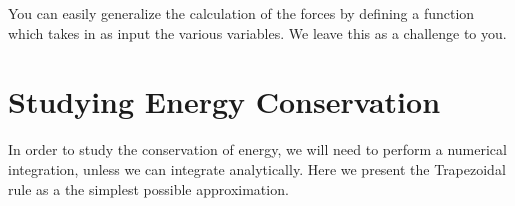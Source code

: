 \documentclass[letterpaper,10pt,english]{sphinxmanual}
\begin{document}
\begin{sphinxVerbatim}[commandchars=\\\{\}]
      \PYG{p}{[}\PYG{p}{]}
    \PYG{p}{[}\PYG{p}{]}  \PYG{p}{[}\PYG{p}{]}  
    \PYG{p}{[}\PYG{p}{]}  \PYG{p}{[}\PYG{p}{]}  
   
\PYG{p}{[}\PYG{p}{]} \PYG{p}{[}\PYG{p}{]}
\end{sphinxVerbatim}

You can easily generalize the calculation of the forces by defining a function
which takes in as input the various variables. We leave this as a challenge to you.


\section{Studying Energy Conservation}
\label{\detokenize{chapter1:studying-energy-conservation}}
In order to study the conservation of energy, we will need to perform
a numerical integration, unless we can integrate analytically. Here we
present the Trapezoidal rule as a the simplest possible approximation.
\end{document}
